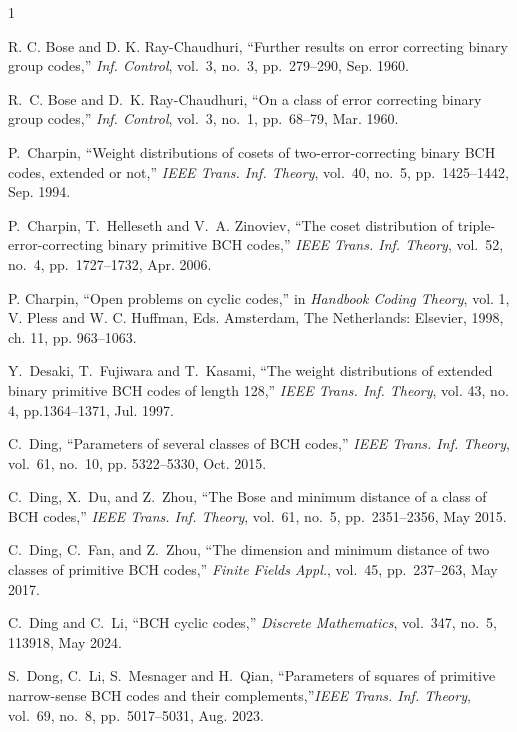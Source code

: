 \documentclass[journal,onecolumn]{IEEEtran}
\begin{document}
\begin{thebibliography}{1}

R. C. Bose and D. K. Ray-Chaudhuri, ``Further results on error correcting
  binary group codes,'' {\em Inf. Control}, vol.~3, no.~3,
  pp.~279--290, Sep. 1960.

R.~C. Bose and D.~K. Ray-Chaudhuri, ``On a class of error correcting binary
  group codes,'' {\em Inf. Control}, vol.~3, no.~1, pp.~68--79, Mar.
  1960.






P.~Charpin, ``Weight distributions of cosets of two-error-correcting binary BCH 
  codes, extended or not,'' {\em IEEE Trans. Inf. Theory},
  vol.~40, no.~5, pp.~1425--1442, Sep. 1994.

P.~Charpin, T.~Helleseth  and V.~A. Zinoviev, ``The coset distribution of
  triple-error-correcting binary primitive BCH codes,'' {\em IEEE Trans. Inf. Theory}, vol.~52, no.~4, pp.~1727--1732, Apr. 2006.

  P. Charpin, ``Open problems on cyclic codes,'' in {\em Handbook Coding Theory}, vol. 1, V. Pless and W. C. Huffman, Eds. Amsterdam,
The Netherlands: Elsevier, 1998, ch. 11, pp. 963--1063.




Y.~Desaki, T.~Fujiwara  and T.~Kasami, ``The weight distributions of extended
  binary primitive BCH codes of length 128,'' {\em IEEE Trans. Inf. Theory}, vol. 43, no. 4, pp.1364--1371, Jul. 1997.

    C.~Ding, ``Parameters of several classes of BCH codes,'' {\em IEEE Trans. Inf. Theory}, vol.~61, no.~10, pp. 5322--5330, Oct. 2015.

C.~Ding, X.~Du, and Z.~Zhou, ``The Bose and minimum distance of a class of BCH
  codes,'' {\em IEEE Trans. Inf. Theory}, vol.~61, no.~5,
  pp.~2351--2356, May 2015.

C.~Ding, C.~Fan, and Z.~Zhou, ``The dimension and minimum distance of two
  classes of primitive BCH codes,'' {\em Finite Fields Appl.},
  vol.~45, pp.~237--263, May 2017.

C.~Ding and C.~Li, ``BCH cyclic codes,'' {\em Discrete Mathematics}, vol.~347,
  no.~5, 113918, May 2024.

S.~Dong, C.~Li, S.~Mesnager and H.~Qian, ``Parameters of squares of primitive
  narrow-sense BCH codes and their complements,''{\em IEEE Trans. Inf. Theory}, vol.~69, no.~8, pp.~5017--5031, Aug. 2023.


\end{thebibliography}
\end{document}
